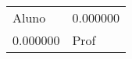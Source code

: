 \begin{tabular}{ll}
\toprule
\midrule
Aluno & 0.000000 \\
0.000000 & Prof \\
\bottomrule
\end{tabular}
